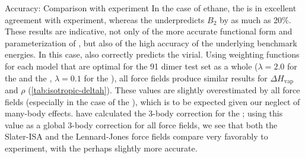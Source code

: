 \begin{subsection}{Accuracy: Comparison with experiment}
In the case of ethane, the \isaffold is in excellent agreement with experiment,
whereas the \saptff underpredicts $B_2$ by as much as 20\%. These results are
indicative, not only of the more accurate functional form and parameterization
of \isaffold, but also of the high accuracy of the underlying \saptpbeo benchmark
energies. In this case, \ljff also correctly predicts the virial.  Using
weighting functions for each model that are optimal for the 91 dimer test set
as a whole ($\lambda = 2.0$ for the \isaffold and the \saptff,
$\lambda = 0.1$ for the \ljff), all force fields produce similar results for
$\Delta H_{\text{vap}}$ and $\rho$ (\cref{tab:isotropic-deltah}). These values are
slightly overestimated by all force fields (especially in the case of the
\saptff), which is to be expected given our neglect of many-body effects.
\citeauthor{McDaniel2014} have calculated the 3-body correction for the
\saptff; using this value as a global 3-body correction for all force fields,
we see that both the Slater-ISA and the Lennard-Jones force fields compare
very favorably to experiment, with the \isaffold perhaps slightly more accurate. 

\end{subsection}

